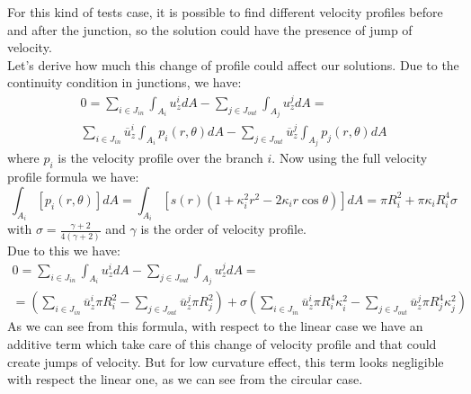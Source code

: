 \documentclass[a4paper]{report}
\begin{document}
For this kind of tests case, it is possible to find different velocity profiles before and after the junction, so the solution could have the presence of jump of velocity.\\
Let's derive how much this change of profile could affect our solutions. Due to the continuity condition in junctions, we have:
\begin{multline}
0= \sum_{i \in J_{in}} \int_{A_i} u_z^i dA - \sum_{j \in J_{out}} \int_{A_j} u^j_z dA = \\
 \sum_{i \in J_{in}}\overline{u}^i_z \int_{A_i} p_i(r,\theta) dA - \sum_{j \in J_{out}} \overline{u}^j_z \int_{A_j} p_j(r,\theta) dA 
\end{multline}
where $p_i$ is the velocity profile over the branch $i$. Now using the full velocity profile formula we have:
\begin{equation}
\int_{A_i} [p_i(r,\theta)] dA =\int_{A_i} [s(r)(1+\kappa_i^2r^2-2 \kappa_i r \cos \theta)] dA= \pi R_i^2+\pi \kappa_i R_i^4 \sigma
\end{equation}
with $\sigma =\frac{\gamma+2}{4(\gamma+2)}$ and $\gamma$ is the order of velocity profile.\\
Due to this we have:
\begin{multline}
0= \sum_{i \in J_{in}} \int_{A_i} u_z^i dA - \sum_{j \in J_{out}} \int_{A_j} u^j_z dA =\\
=(\sum_{i \in J_{in}} \overline{u}_z^i \pi R_i^2 - \sum_{j \in J_{out}}\overline{u}_z^j \pi R_j^2)+\sigma(\sum_{i \in J_{in}} \overline{u}_z^i \pi R_i^4 \kappa_i^2 - \sum_{j \in J_{out}}\overline{u}_z^j \pi R_j^4 \kappa_j^2)
\end{multline}
As we can see from this formula, with respect to the linear case we have an additive term which take care of this change of velocity profile and that could create jumps of velocity. But for low curvature effect, this term looks negligible with respect the linear one, as we can see from the circular case.

\newpage
\end{document}
